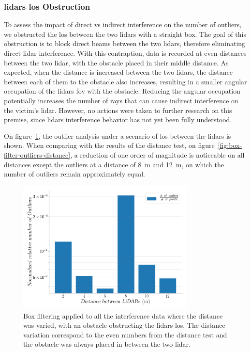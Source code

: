 \subsubsection{\acp{lidar} \ac{los} Obstruction}
To assess the impact of direct vs indirect interference on the number of outliers, we obstructed the \acf{los} between the two \acp{lidar} with a straight box. The goal of this obstruction is to block direct beams between the two \acp{lidar}, therefore eliminating direct \ac{lidar} interference. With this contraption, data is recorded at even distances between the two \ac{lidar}, with the obstacle placed in their middle distance. As expected, when the distance is increased between the two \acp{lidar}, the distance between each of them to the obstacle also increases, resulting in a smaller angular occupation of the \acp{lidar} \ac{fov} with the obstacle. Reducing the angular occupation potentially increases the number of rays that can cause indirect interference on the victim's \ac{lidar}. However, no actions were taken to further research on this premise, since \acp{lidar} interference behavior has not yet been fully understood.

On figure~\ref{fig:box-filter-outliers-LOS}, the outlier analysis under a scenario of \ac{los} between the \acp{lidar} is shown. When comparing with the results of the distance test, on figure~\ref{fig:box-filter-outliers-distance}, a reduction of one order of magnitude is noticeable on all distances except the outliers at a distance of \SI{8}{\meter} and \SI{12}{\meter}, on which the number of outliers remain approximately equal. 

\begin{figure}[!ht]
\centering
\includegraphics[width=0.8\textwidth]{img/lidar-interference/box-filtering/interference-box-filter-outliers-LOS.png}
\caption{Box filtering applied to all the interference data where the distance was varied, with an obstacle obstructing the \acp{lidar} \ac{los}. The distance variation correspond to the even numbers from the distance test and the obstacle was always placed in between the two \ac{lidar}.}
\label{fig:box-filter-outliers-LOS}
\end{figure}

